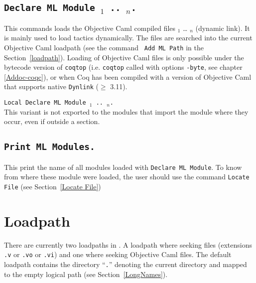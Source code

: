 \subsection[\tt Declare ML Module {\str$_1$} .. {\str$_n$}.]{\tt Declare ML Module {\str$_1$} .. {\str$_n$}.}
This commands loads the Objective Caml compiled files {\str$_1$} {\dots}
{\str$_n$} (dynamic link). It is mainly used to load tactics
dynamically.
 The files are
searched into the current Objective Caml loadpath (see the command {\tt
Add ML Path} in the Section~\ref{loadpath}).  Loading of Objective Caml
files is only possible under the bytecode version of {\tt coqtop}
(i.e. {\tt coqtop} called with options {\tt -byte}, see chapter 
\ref{Addoc-coqc}), or when Coq has been compiled with a version of
Objective Caml that supports native {\tt Dynlink} ($\ge$ 3.11).

\begin{Variants}
\item {\tt Local Declare ML Module {\str$_1$} .. {\str$_n$}.}\\
  This variant is not exported to the modules that import the module
  where they occur, even if outside a section.
\end{Variants}

\begin{ErrMsgs}
\item {}
\item {}
\end{ErrMsgs}

\subsection[\tt Print ML Modules.]{\tt Print ML Modules.}
This print the name of all \ocaml{} modules loaded with \texttt{Declare
  ML Module}. To know from where these module were loaded, the user
should use the command \texttt{Locate File} (see Section~\ref{Locate File})

\section[Loadpath]{Loadpath\label{loadpath}}

There are currently two loadpaths in \Coq. A loadpath where seeking
{\Coq} files (extensions {\tt .v} or {\tt .vo} or {\tt .vi}) and one where
seeking Objective Caml files. The default loadpath contains the
directory ``\texttt{.}'' denoting the current directory and mapped to the empty logical path (see Section~\ref{LongNames}).


